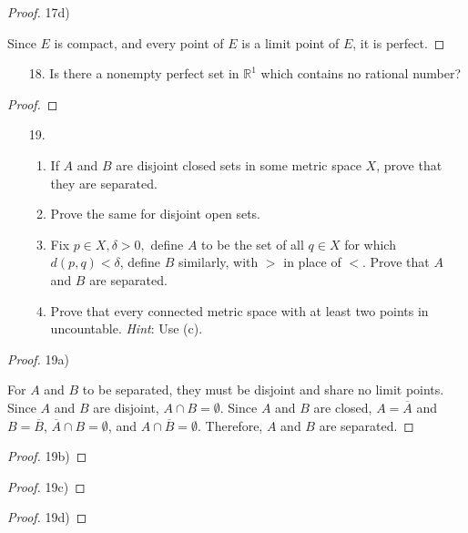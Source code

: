 \documentclass[10pt]{article}
\theoremstyle{definition}
\theoremstyle{plain}
\newcommand{\R}{\mathbb{R}}
\begin{document}
\begin{proof}
17d)

Since $E$ is compact, and every point of $E$ is a limit point of $E$, it is perfect.
\end{proof}




\pagebreak




\begin{enumerate}
\item[18.] Is there a nonempty perfect set in $\R^1$ which contains no rational number?
\end{enumerate}

\begin{proof}

\end{proof}




\pagebreak




\begin{enumerate}
\item[19.]
\begin{enumerate}
\item If $A$ and $B$ are disjoint closed sets in some metric space $X$, prove that they are separated.
\item Prove the same for disjoint open sets.
\item Fix $p\in X, \delta >0,$ define $A$ to be the set of all $q\in X$ for which $d(p,q)<\delta$, define $B$ similarly, with $>$ in place of $<$. Prove that $A$ and $B$ are separated.
\item Prove that every connected metric space with at least two points in uncountable. \textit{Hint}: Use (c).
\end{enumerate}
\end{enumerate}

\begin{proof}
19a)

For $A$ and $B$ to be separated, they must be disjoint and share no limit points. Since $A$ and $B$ are disjoint, $A\cap B=\emptyset$. Since $A$ and $B$ are closed, $A=\overline{A}$ and $B=\overline{B}$, $\overline{A}\cap B=\emptyset$, and $A\cap\overline{B}=\emptyset$. Therefore, $A$ and $B$ are separated.
\end{proof}

\begin{proof}
19b)


\end{proof}


\begin{proof}
19c)


\end{proof}


\begin{proof}
19d)


\end{proof}
\end{document}
